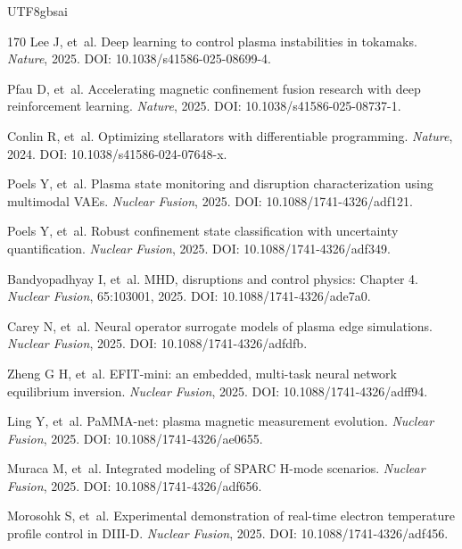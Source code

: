 \documentclass[12pt,a4paper]{article}
\begin{document}
\begin{CJK}{UTF8}{gbsai}
\begin{thebibliography}{170}
Lee J, et~al.
\newblock Deep learning to control plasma instabilities in tokamaks.
\newblock \textit{Nature}, 2025. DOI: 10.1038/s41586-025-08699-4.

Pfau D, et~al.
\newblock Accelerating magnetic confinement fusion research with deep reinforcement learning.
\newblock \textit{Nature}, 2025. DOI: 10.1038/s41586-025-08737-1.

Conlin R, et~al.
\newblock Optimizing stellarators with differentiable programming.
\newblock \textit{Nature}, 2024. DOI: 10.1038/s41586-024-07648-x.

Poels Y, et~al.
\newblock Plasma state monitoring and disruption characterization using multimodal VAEs.
\newblock \textit{Nuclear Fusion}, 2025. DOI: 10.1088/1741-4326/adf121.

Poels Y, et~al.
\newblock Robust confinement state classification with uncertainty quantification.
\newblock \textit{Nuclear Fusion}, 2025. DOI: 10.1088/1741-4326/adf349.

Bandyopadhyay I, et~al.
\newblock MHD, disruptions and control physics: Chapter 4.
\newblock \textit{Nuclear Fusion}, 65:103001, 2025. DOI: 10.1088/1741-4326/ade7a0.

Carey N, et~al.
\newblock Neural operator surrogate models of plasma edge simulations.
\newblock \textit{Nuclear Fusion}, 2025. DOI: 10.1088/1741-4326/adfdfb.

Zheng G H, et~al.
\newblock EFIT-mini: an embedded, multi-task neural network equilibrium inversion.
\newblock \textit{Nuclear Fusion}, 2025. DOI: 10.1088/1741-4326/adff94.

Ling Y, et~al.
\newblock PaMMA-net: plasma magnetic measurement evolution.
\newblock \textit{Nuclear Fusion}, 2025. DOI: 10.1088/1741-4326/ae0655.

Muraca M, et~al.
\newblock Integrated modeling of SPARC H-mode scenarios.
\newblock \textit{Nuclear Fusion}, 2025. DOI: 10.1088/1741-4326/adf656.

Morosohk S, et~al.
\newblock Experimental demonstration of real-time electron temperature profile control in DIII-D.
\newblock \textit{Nuclear Fusion}, 2025. DOI: 10.1088/1741-4326/adf456.


\end{thebibliography}
\end{CJK}
\end{document}
